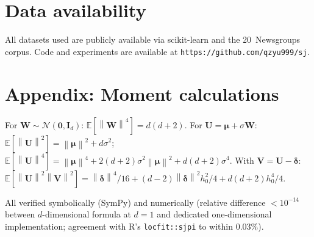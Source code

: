 \documentclass[numsec,webpdf,modern,medium,namedate]{oup-authoring-template}
\theoremstyle{thmstyleone}
\theoremstyle{thmstyletwo}
\theoremstyle{thmstylethree}
\newcommand{\E}{\mathbb{E}}
\newcommand{\bdelta}{\bm{\delta}}
\newcommand{\bU}{\bm{U}}
\newcommand{\bV}{\bm{V}}
\newcommand{\bW}{\bm{W}}
\newcommand{\Id}{\bm{I}_d}
\newcommand{\norm}[1]{\left\| #1 \right\|}
\begin{document}
\section*{Data availability}

All datasets used are publicly available via scikit-learn and the 20~Newsgroups corpus. Code and experiments are available at \texttt{https://github.com/qzyu999/sj}.


\section*{Appendix: Moment calculations}\label{app:moments}

For $\bW \sim \mathcal{N}(\bm{0}, \Id)$: $\E[\norm{\bW}^4] = d(d+2)$.
For $\bU = \bm{\mu} + \sigma\bW$: $\E[\norm{\bU}^2] = \norm{\bm{\mu}}^2 + d\sigma^2$; $\E[\norm{\bU}^4] = \norm{\bm{\mu}}^4 + 2(d{+}2)\sigma^2\norm{\bm{\mu}}^2 + d(d{+}2)\sigma^4$.
With $\bV = \bU - \bdelta$: $\E[\norm{\bU}^2\norm{\bV}^2] = \norm{\bdelta}^4/16 + (d{-}2)\norm{\bdelta}^2h_0^2/4 + d(d{+}2)h_0^4/4$.

All verified symbolically (SymPy) and numerically (relative difference $< 10^{-14}$ between $d$-dimensional formula at $d{=}1$ and dedicated one-dimensional implementation; agreement with R's \texttt{locfit::sjpi} to within $0.03\%$).

\end{document}
